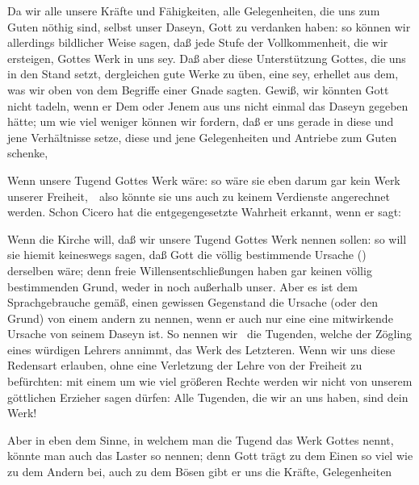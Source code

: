 \begin{aufza}
\item Da wir alle unsere Kräfte und Fähigkeiten, alle Gelegenheiten, die uns zum Guten nöthig sind, selbst unser Daseyn, Gott zu verdanken haben: so können wir allerdings bildlicher Weise sagen, daß jede Stufe der Vollkommenheit, die wir ersteigen, Gottes Werk in uns sey. Daß aber diese Unterstützung Gottes, die uns in den Stand setzt, dergleichen gute Werke zu üben, eine  sey, erhellet aus dem, was wir oben von dem Begriffe einer Gnade sagten. Gewiß, wir könnten Gott nicht tadeln, wenn er Dem oder Jenem aus uns nicht einmal das Daseyn gegeben hätte; um wie viel weniger können wir fordern, daß er uns gerade in diese und jene Verhältnisse setze, diese und jene Gelegenheiten und Antriebe zum Guten schenke, \usw\
\begin{aufzb}
\item {} Wenn unsere Tugend Gottes Werk wäre: so wäre sie eben darum gar kein Werk unserer Freiheit,~\ also könnte sie uns auch zu keinem Verdienste angerechnet werden. Schon Cicero hat die entgegengesetzte Wahrheit erkannt, wenn er  sagt: \par
\RWbet{Antwort.} Wenn die Kirche will, daß wir unsere Tugend Gottes Werk nennen sollen: so will sie hiemit keineswegs sagen, daß Gott die völlig bestimmende Ursache (\RWlat{causa determinans}) derselben wäre; denn freie Willensentschließungen haben gar keinen völlig bestimmenden Grund, weder in noch außerhalb unser. Aber es ist dem Sprachgebrauche gemäß, einen gewissen Gegenstand die Ursache (oder den Grund) von einem andern zu nennen, wenn er auch nur eine  eine mitwirkende Ursache von seinem Daseyn ist. So nennen wir \zB\ die Tugenden, welche der Zögling eines würdigen Lehrers annimmt, das Werk des Letzteren. Wenn wir uns diese Redensart erlauben, ohne eine Verletzung der Lehre von der Freiheit zu befürchten: mit einem um wie viel größeren Rechte werden wir nicht von unserem göttlichen Erzieher sagen dürfen: Alle Tugenden, die wir an uns haben, sind dein Werk!
\item \RWbet{Einwurf.} Aber in eben dem Sinne, in welchem man die Tugend das Werk Gottes nennt, könnte man auch das Laster so nennen; denn Gott trägt zu dem Einen so viel wie zu dem Andern bei, auch zu dem Bösen gibt er uns die Kräfte, Gelegenheiten \usw\par

\end{aufzb}
\end{aufza}
